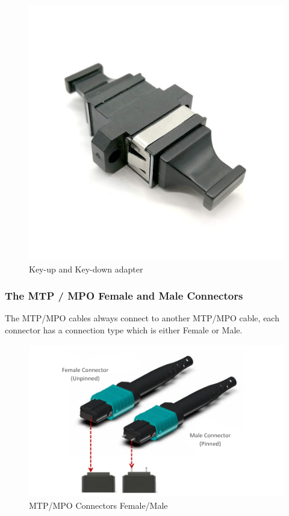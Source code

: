 \begin{figure}
  \includegraphics[width=\textwidth]{images/4.jpg}
  \caption{Key-up and Key-down adapter}
  \label{fig:jlsimon}
\end{figure}

\subsubsection{The MTP / MPO Female and Male Connectors}

The MTP/MPO cables always connect to another MTP/MPO cable, each connector has a connection type which is either Female or Male.

\begin{figure}
  \includegraphics[width=\textwidth]{images/5.jpeg}
  \caption{MTP/MPO Connectors Female/Male}
  \label{fig:jlsimon}
\end{figure}


